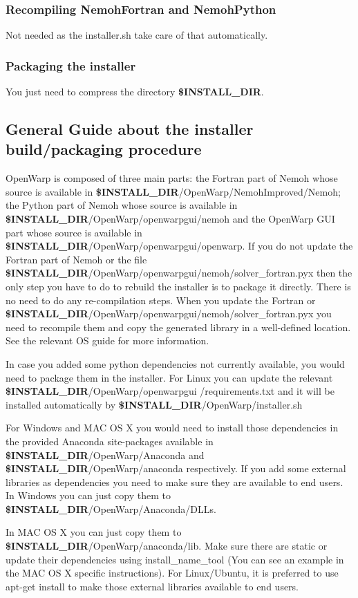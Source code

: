 \documentclass[12pt]{article}
\newcommand{\INSTALLDIR}{{\textbf{\$INSTALL{\_}DIR}}}
\begin{document}
\subsubsection{Recompiling NemohFortran and NemohPython}
Not needed as the installer.sh take care of that automatically.
\subsubsection{Packaging the installer}
You just need to compress the directory \INSTALLDIR.

\subsection{General Guide about the installer build/packaging procedure}

OpenWarp is composed of three main parts: the Fortran part of Nemoh whose source is available in \INSTALLDIR/OpenWarp/NemohImproved/Nemoh; the Python part of Nemoh whose source is available in \INSTALLDIR/OpenWarp/openwarpgui/nemoh and the OpenWarp GUI part whose source is available in \INSTALLDIR/OpenWarp/openwarpgui/openwarp.
If you do not update the Fortran part of Nemoh or the file \INSTALLDIR/OpenWarp/openwarpgui/nemoh/solver_fortran.pyx then the only step you have to do to rebuild the installer is to package it directly. There is no need to do any re-compilation steps.
When you update the Fortran or \INSTALLDIR/OpenWarp/openwarpgui/nemoh/solver_fortran.pyx you need to recompile them and copy the generated library in a well-defined location. See the relevant OS guide for more information.


In case you added some python dependencies not currently available, you would need to package them in the installer. For Linux you can update the relevant \INSTALLDIR/OpenWarp/openwarpgui /requirements.txt and it will be installed automatically by \INSTALLDIR/OpenWarp/installer.sh

For Windows and MAC OS X you would need to install those dependencies in the provided Anaconda site-packages available in \INSTALLDIR/OpenWarp/Anaconda and \INSTALLDIR/OpenWarp/anaconda respectively.
If you add some external libraries as dependencies you need to make sure they are available to end users. In Windows you can just copy them to \INSTALLDIR/OpenWarp/Anaconda/DLLs.

In MAC OS X you can just copy them to \INSTALLDIR/OpenWarp/anaconda/lib. Make sure there are static or update their dependencies using install_name_tool (You can see an example in the MAC OS X specific instructions).
For Linux/Ubuntu, it is preferred to use apt-get install to make those external libraries available to end users.
\end{document}
